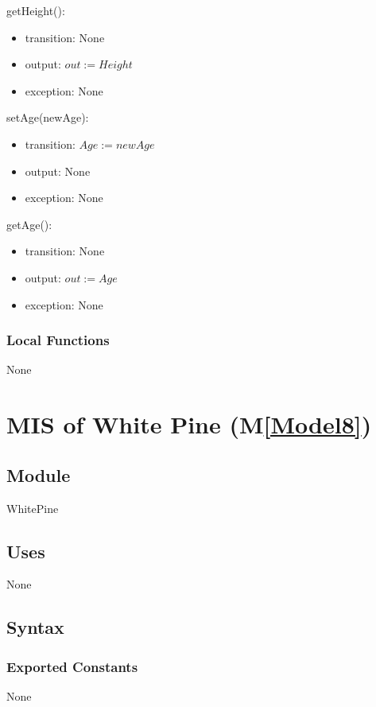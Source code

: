 \documentclass[12pt, titlepage]{article}
\newcommand{\mref}[1]{M\ref{#1}}
\begin{document}
\noindent getHeight():
\begin{itemize}
\item transition: None
\item output: $\mathit{out := Height}$
\item exception: None
\end{itemize}
\noindent setAge(newAge):
\begin{itemize}
\item transition: $\mathit{Age := newAge}$
\item output: None
\item exception: None
\end{itemize}
\noindent getAge():
\begin{itemize}
\item transition: None
\item output: $\mathit{out := Age}$
\item exception: None
\end{itemize}

\subsubsection{Local Functions}
None

\newpage

\renewcommand{\tn}{White Pine }
\renewcommand{\tmn}{WhitePine}
\renewcommand{\constn}{White\ Pine}

\section{MIS of \tn (\mref{Model8})}

\subsection{Module}
\tmn

\subsection{Uses}
None

\subsection{Syntax}
\subsubsection{Exported Constants}
None
\end{document}
